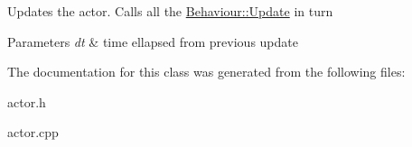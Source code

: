 Updates the actor. Calls all the \mbox{\hyperlink{classNewtonic_1_1Behaviour_aaed714f38c7b270381e81958b280d248}{Behaviour\+::\+Update}} in turn 
\begin{DoxyParams}{Parameters}
{\em dt} & time ellapsed from previous update \\
\hline
\end{DoxyParams}


The documentation for this class was generated from the following files\+:\begin{DoxyCompactItemize}
\item 
actor.\+h\item 
actor.\+cpp\end{DoxyCompactItemize}
